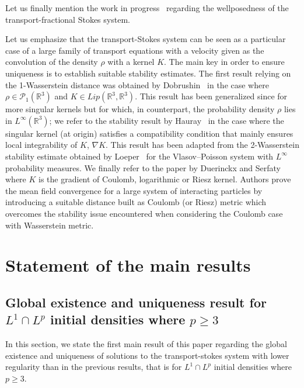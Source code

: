 \documentclass[AHL,Unicode,longabstracts,published]{cedram}
\newcommand{\R}{\mathbb{R}}
\newcommand{\clP}{\mathcal{P}}
\renewcommand{\geq}{\geqslant}
\begin{document}
Let us finally mention the work in progress~\cite{Cobb} regarding the wellposedness of the transport-fractional Stokes system.

Let us emphasize that the transport-Stokes system can be seen as a particular case of a large family of transport equations with a velocity given as the convolution of the density $\rho$ with a kernel $K$. The main key in order to ensure uniqueness is to establish suitable stability estimates. The first result relying on the 1-Wasserstein distance was obtained by Dobrushin~\cite{Dobrushin} in the case where $\rho \in \clP_1(\R^3)$ and $K\in Lip(\R^3,\R^3)$. This result has been generalized since for more singular kernels but for which, in counterpart, the probability density $\rho$ lies in $L^\infty(\R^3)$; we refer to the stability result by Hauray~\cite{Hauray} in the case where the singular kernel (at origin) satisfies a compatibility condition that mainly ensures local integrability of $K$, $\nabla K$. This result has been adapted from the 2-Wasserstein stability estimate obtained by Loeper~\cite{Loeper} for the Vlasov--Poisson system with $L^\infty$ probability measures. We finally refer to the paper by Duerinckx and Serfaty~\cite{Serfaty&Duerinckx} where $K$ is the gradient of Coulomb, logarithmic or Riesz kernel. Authors prove the mean field convergence for a large system of interacting particles by introducing a suitable distance built as Coulomb (or Riesz) metric which overcomes the stability issue encountered when considering the Coulomb case with Wasserstein metric.



\section{Statement of the main results}

\subsection{Global existence and uniqueness result for \texorpdfstring{$L^1 \cap L^p$}{L1 n Lp} initial densities where \texorpdfstring{$p \geq 3$}{p>=3}}

In this section, we state the first main result of this paper regarding the global existence and uniqueness of solutions to the transport-stokes system with lower regularity than in the previous results, that is for $L^1 \cap L^p$ initial densities where $p \geq 3$.
\end{document}
